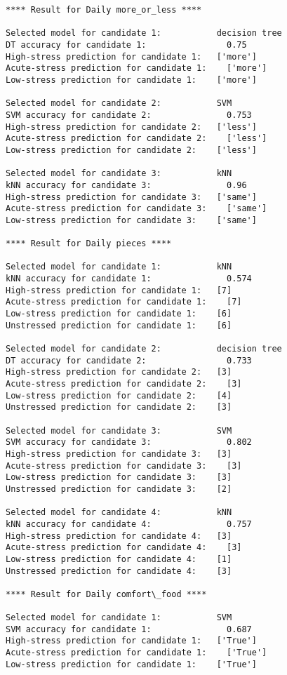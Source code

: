 \begin{lstlisting}[label={model-selection},caption={Result of model selection and prediction for each task},captionpos=b]
**** Result for Daily more_or_less ****

Selected model for candidate 1:           decision tree
DT accuracy for candidate 1:	            0.75
High-stress prediction for candidate 1:	  ['more']
Acute-stress prediction for candidate 1:	['more']
Low-stress prediction for candidate 1:	  ['more']

Selected model for candidate 2:           SVM
SVM accuracy for candidate 2:	            0.753
High-stress prediction for candidate 2:	  ['less']
Acute-stress prediction for candidate 2:	['less']
Low-stress prediction for candidate 2:	  ['less']

Selected model for candidate 3:           kNN
kNN accuracy for candidate 3:	            0.96
High-stress prediction for candidate 3:	  ['same']
Acute-stress prediction for candidate 3:	['same']
Low-stress prediction for candidate 3:	  ['same']

**** Result for Daily pieces ****

Selected model for candidate 1:           kNN
kNN accuracy for candidate 1:	            0.574
High-stress prediction for candidate 1:	  [7]
Acute-stress prediction for candidate 1:	[7]
Low-stress prediction for candidate 1:	  [6]
Unstressed prediction for candidate 1:	  [6]

Selected model for candidate 2:           decision tree
DT accuracy for candidate 2:	            0.733
High-stress prediction for candidate 2:	  [3]
Acute-stress prediction for candidate 2:	[3]
Low-stress prediction for candidate 2:	  [4]
Unstressed prediction for candidate 2:	  [3]

Selected model for candidate 3:           SVM
SVM accuracy for candidate 3:	            0.802
High-stress prediction for candidate 3:	  [3]
Acute-stress prediction for candidate 3:	[3]
Low-stress prediction for candidate 3:	  [3]
Unstressed prediction for candidate 3:	  [2]

Selected model for candidate 4:           kNN
kNN accuracy for candidate 4:	            0.757
High-stress prediction for candidate 4:	  [3]
Acute-stress prediction for candidate 4:	[3]
Low-stress prediction for candidate 4:	  [1]
Unstressed prediction for candidate 4:	  [3]

**** Result for Daily comfort\_food ****

Selected model for candidate 1:           SVM
SVM accuracy for candidate 1:	            0.687
High-stress prediction for candidate 1:	  ['True']
Acute-stress prediction for candidate 1:	['True']
Low-stress prediction for candidate 1:	  ['True']


\end{lstlisting}
